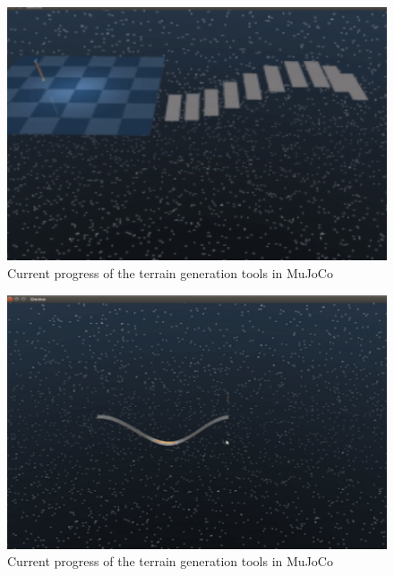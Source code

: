 \begin{figure}
    \centering
    \includegraphics[width=6in]{./chapters/imgs/img_current_progress_terrain_generation_3.png}
    \caption[img_cp_terrain_generation_mujoco_1]{Current progress of the terrain generation tools in MuJoCo}
    \label{fig:img_cp_terrain_generation_mujoco_1}
\end{figure}

\begin{figure}
    \centering
    \includegraphics[width=6in]{./chapters/imgs/img_current_progress_terrain_generation_4.png}
    \caption[img_cp_terrain_generation_mujoco_2]{Current progress of the terrain generation tools in MuJoCo}
    \label{fig:img_cp_terrain_generation_mujoco_2}
\end{figure}